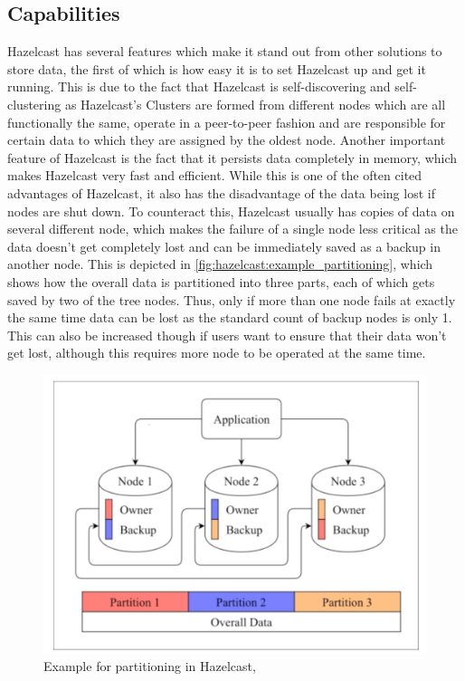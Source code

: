 \subsection{Capabilities} \label{subsec:capabilitiesHazelcast}
Hazelcast has several features which make it stand out from other solutions to store data, the first of which is how easy it is 
to set Hazelcast up and get it running. This is due to the fact that Hazelcast is self-discovering and self-clustering as Hazelcast's 
Clusters are formed from different nodes which are all functionally the same, operate in a peer-to-peer fashion and are responsible for 
certain data to which they are assigned by the oldest node\parencite{Johns.2015}. \newline
Another important feature of Hazelcast is the fact that it persists data completely in memory, which makes Hazelcast very fast and efficient.
While this is one of the often cited advantages of Hazelcast, it also has the disadvantage of the data being lost if nodes are shut down. To counteract this, Hazelcast usually has copies of data on several different node, which makes the failure of a single node less critical as the data doesn't get completely lost and can be immediately saved as a backup 
in another node. This is depicted in \autoref{fig:hazelcast:example_partitioning}, which shows how the overall data is partitioned into three parts, each of which gets saved by two of the tree nodes. Thus, only if more than 
one node fails at exactly the same time data can be lost as the standard count of backup nodes is only 1. This can also be increased though if users want to 
ensure that their data won't get lost, although this requires more node to be operated at the same time\parencite{Johns.2015}. \newline

\begin{figure}[H]
    \centering
    \includegraphics[width=16cm]{images/hazelcast_partitioning.png}
    \caption[Example for partitioning in Hazelcast]{Example for partitioning in Hazelcast, \parencite{Johns.2015}}
    \label{fig:hazelcast:example_partitioning}
\end{figure}

